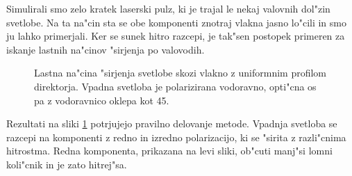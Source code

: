 \documentclass[a4paper,10pt]{article}
\begin{document}
Simulirali smo zelo kratek laserski pulz, ki je trajal le nekaj valovnih dol"zin svetlobe. 
Na ta na"cin sta se obe komponenti znotraj vlakna jasno lo"cili in smo ju lahko primerjali. 
Ker se sunek hitro razcepi, je tak"sen postopek primeren za iskanje lastnih na"cinov "sirjenja po valovodih\cite{taflove}. 

\begin{figure}[!htbp]
 \centering
 \caption{Lastna na"cina "sirjenja svetlobe skozi vlakno z uniformnim profilom direktorja. Vpadna svetloba je polarizirana vodoravno, opti"cna os pa z vodoravnico oklepa kot 45\degree. }
 \label{fig:pulse-0-mode}
\end{figure}

Rezultati na sliki \ref{fig:pulse-0-mode} potrjujejo pravilno delovanje metode. 
Vpadnja svetloba se razcepi na komponenti z redno in izredno polarizacijo, ki se "sirita z razli"cnima hitrostma. 
Redna komponenta, prikazana na levi sliki, ob"cuti manj"si lomni koli"cnik in je zato hitrej"sa. 
\end{document}
